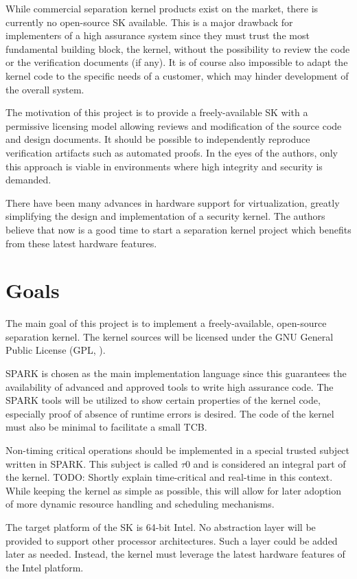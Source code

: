 While commercial separation kernel products exist on the market, there is
currently no open-source SK available. This is a major drawback for
implementers of a high assurance system since they must trust the most
fundamental building block, the kernel, without the possibility to review the
code or the verification documents (if any). It is of course also impossible to
adapt the kernel code to the specific needs of a customer, which may hinder
development of the overall system.

The motivation of this project is to provide a freely-available SK with a
permissive licensing model allowing reviews and modification of
the source code and design documents. It should be possible to independently
reproduce verification artifacts such as automated proofs. In the eyes of the
authors, only this approach is viable in environments where high integrity and
security is demanded.

There have been many advances in hardware support for virtualization, greatly
simplifying the design and implementation of a security kernel. The authors
believe that now is a good time to start a separation kernel project which
benefits from these latest hardware features.

\section{Goals}
The main goal of this project is to implement a freely-available, open-source
separation kernel. The kernel sources will be licensed under the GNU General
Public License (GPL, \cite{gpl}).

SPARK is chosen as the main implementation language since this guarantees the
availability of advanced and approved tools to write high assurance code. The
SPARK tools will be utilized to show certain properties of the kernel code,
especially proof of absence of runtime errors is desired. The code of the kernel
must also be minimal to facilitate a small TCB.

Non-timing critical operations should be implemented in a special trusted
subject written in SPARK. This subject is called $\tau$0 and is considered an
integral part of the kernel. TODO: Shortly explain time-critical and real-time
in this context. While keeping the kernel as simple as possible, this will
allow for later adoption of more dynamic resource handling and scheduling
mechanisms.

The target platform of the SK is 64-bit Intel. No abstraction layer will be
provided to support other processor architectures. Such a layer could be added
later as needed. Instead, the kernel must leverage the latest hardware
features of the Intel platform.

